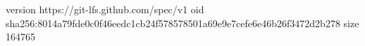 version https://git-lfs.github.com/spec/v1
oid sha256:8014a79fde0c0f46eedc1cb24f578578501a69e9e7cefe6e46b26f3472d2b278
size 164765
